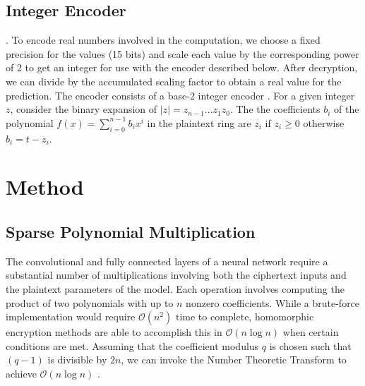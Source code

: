 \documentclass[conference]{IEEEtran}
\begin{document}
\subsection{Integer Encoder}.
To encode real numbers involved in the computation, we choose a fixed precision for the values (15 bits) and scale each value by the corresponding power of 2 to get an integer for use with the encoder described below. After decryption, we can divide by the accumulated scaling factor to obtain a real value for the prediction.
The encoder consists of a base-2 integer encoder \cite{seal23}.
For a given integer $z$, consider the binary expansion of $|z| = z_{n-1}...z_1 z_0$.
The the coefficients $b_i$ of the polynomial $f(x) = \sum_{i=0}^{n - 1} b_ix^i$ in the plaintext ring are $z_i$ if $z_i \geq 0$ otherwise $b_i=t-z_i$.




\section{Method}\label{sec:method}


\subsection{Sparse Polynomial Multiplication}

The convolutional and fully connected layers of a neural network require a substantial number of multiplications involving both the ciphertext inputs and the plaintext parameters of the model.
Each operation involves computing the product of two polynomials with up to $n$ nonzero coefficients.
While a brute-force implementation would require $\mathcal{O}(n^2)$ time to complete, homomorphic encryption methods are able to accomplish this in $\mathcal{O}(n\log{}n)$ when certain conditions are met.
Assuming that the coefficient modulus $q$ is chosen such that $(q-1)$ is divisible by $2n$, we can invoke the Number Theoretic Transform to achieve $\mathcal{O}(n\log{}n)$ \cite{harvey2014faster}.
\end{document}
